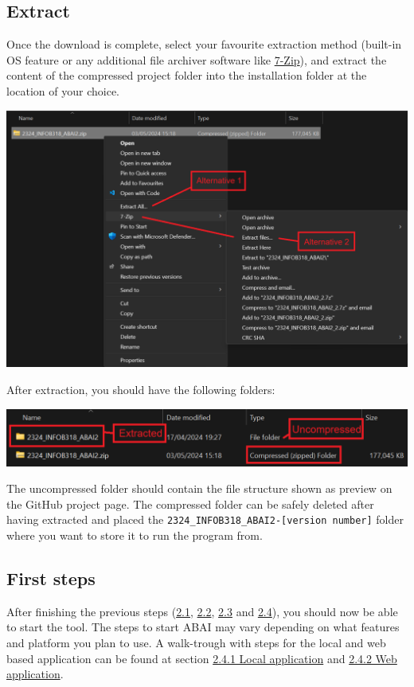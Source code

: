 \subsection{Extract}
\label{subsec:Extract}
Once the download is complete, select your favourite extraction method (built-in OS feature or any additional file archiver software like \href{https://7-zip.org/}{7-Zip}), and extract the content of the compressed project folder into the installation folder at the location of your choice.
\begin{center}
\includegraphics[width=17cm]{Images/Extract/Extraction.png}
\end{center}

After extraction, you should have the following folders: 
\begin{center}
\includegraphics[width=17cm]{Images/Extract/after_extraction.png}
\end{center}

The uncompressed folder should contain the file structure shown as preview on the GitHub project page. The compressed folder can be safely deleted after having extracted and placed the \texttt{2324\_INFOB318\_ABAI2-[\texttt{version number}]} folder where you want to store it to run the program from.


\subsection{First steps}
\label{subsec:First steps}
After finishing the previous steps (\hyperref[subsec:Requirements]{2.1}, \hyperref[subsec:Download]{2.2}, \hyperref[subsec:Extract]{2.3} and \hyperref[subsec:First steps]{2.4}), you should now be able to start the tool. The steps to start ABAI may vary depending on what features and platform you plan to use. A walk-trough with steps for the local and web based application can be found at section \hyperref[subsubsec:Local application]{2.4.1 Local application} and \hyperref[subsubsec:Web application]{2.4.2 Web application}.

